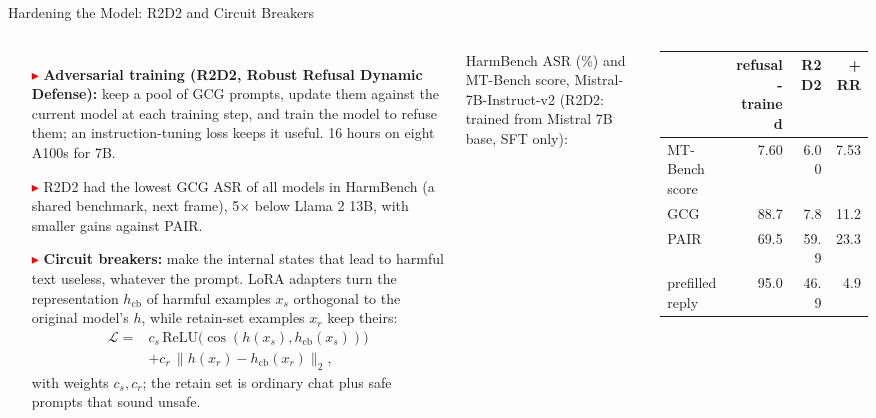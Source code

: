 \begin{frame}{Hardening the Model: R2D2 and Circuit Breakers}
  \begin{columns}[T,onlytextwidth]
      \begin{itemize}\footnotesize\itemsep0.3em
        \item[\textcolor{red}{$\blacktriangleright$}] \textbf{Adversarial training (R2D2, Robust Refusal Dynamic Defense):} keep a pool of GCG prompts, update them against the current model at each training step, and train the model to refuse them; an instruction-tuning loss keeps it useful. 16 hours on eight A100s for 7B.
        \item[\textcolor{red}{$\blacktriangleright$}] R2D2 had the lowest GCG ASR of all models in HarmBench (a shared benchmark, next frame), 5$\times$ below Llama 2 13B, with smaller gains against PAIR.
        \item[\textcolor{red}{$\blacktriangleright$}] \textbf{Circuit breakers:} make the internal states that lead to harmful text useless, whatever the prompt. LoRA adapters turn the representation $h_{\text{cb}}$ of harmful examples $x_s$ orthogonal to the original model's $h$, while retain-set examples $x_r$ keep theirs:
          \[ \begin{aligned} \mathcal{L} = {} & c_s\,\mathrm{ReLU}\big(\cos(h(x_s), h_{\text{cb}}(x_s))\big) \\ & + c_r\,\big\lVert h(x_r) - h_{\text{cb}}(x_r)\big\rVert_2, \end{aligned} \]
          with weights $c_s, c_r$; the retain set is ordinary chat plus safe prompts that sound unsafe.
      \end{itemize}
      \centering
      {\scriptsize HarmBench ASR (\%) and MT-Bench score, Mistral-7B-Instruct-v2 (R2D2: trained from Mistral 7B base, SFT only):\par}
      \vspace{0.3em}
      {\scriptsize\setlength{\tabcolsep}{4pt}
      \begin{tabular}{l r r r}
        \toprule
         & \textbf{refusal-trained} & \textbf{R2D2} & \textbf{+ RR} \\
        \midrule
        MT-Bench score & 7.60 & 6.00 & 7.53 \\
        GCG & 88.7 & 7.8 & 11.2 \\
        PAIR & 69.5 & 59.9 & 23.3 \\
        prefilled reply & 95.0 & 46.9 & 4.9 \\

\end{tabular}}
\end{columns}
\end{frame}
